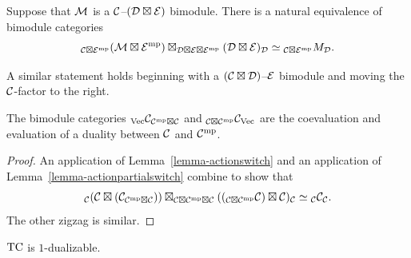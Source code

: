 \documentclass{amsart}
\begin{document}
\begin{lemma} \label{lemma-actionpartialswitch}
Suppose that $\mathcal M$ is a $\mathcal C$--$(\mathcal D \boxtimes \mathcal E)$ bimodule.  There is a natural equivalence of bimodule categories
$${}_{\mathcal C \boxtimes \mathcal E^{\mathrm{mp}}} (\mathcal M \boxtimes \mathcal E^{\mathrm{mp}}) \boxtimes_{\mathcal D \boxtimes \mathcal E \boxtimes \mathcal E^{\mathrm{mp}}} (\mathcal D \boxtimes \mathcal E)_\mathcal D \simeq {}_{\mathcal C \boxtimes \mathcal E^{\mathrm{mp}}}M_\mathcal D.$$
\end{lemma}

\nid A similar statement holds beginning with a $(\mathcal C \boxtimes \mathcal D)$--$\mathcal E$ bimodule and moving the $\mathcal C$-factor to the right.

\begin{proposition} \label{thm:objduals}
The bimodule categories ${}_\mathrm{\mathrm{Vec}} \mathcal C_{\mathcal C^{\mathrm{mp}} \boxtimes \mathcal C}$ and ${}_{\mathcal C \boxtimes \mathcal C^{\mathrm{mp}}} \mathcal C_{\mathrm{Vec}}$ are the coevaluation and evaluation of a duality between $\mathcal C$ and $\mathcal C^{\mathrm{mp}}$.
\end{proposition}
\begin{proof}
An application of Lemma~\ref{lemma-actionswitch} and an application of Lemma~\ref{lemma-actionpartialswitch} combine to show that
\[
{}_\mathcal C (\mathcal C \boxtimes (\mathcal C_{\mathcal C^{\mathrm{mp}} \boxtimes \mathcal C})) \boxtimes_{\mathcal C \boxtimes \mathcal C^{\mathrm{mp}} \boxtimes \mathcal C} (({}_{\mathcal C \boxtimes \mathcal C^{\mathrm{mp}}} \mathcal C) \boxtimes \mathcal C)_\mathcal C
\simeq
{}_\mathcal C \mathcal C_\mathcal C.
\]
The other zigzag is similar.
\end{proof}

\begin{corollary}
	$\mathrm{TC}$ is $1$-dualizable. 
\end{corollary}

\end{document}
